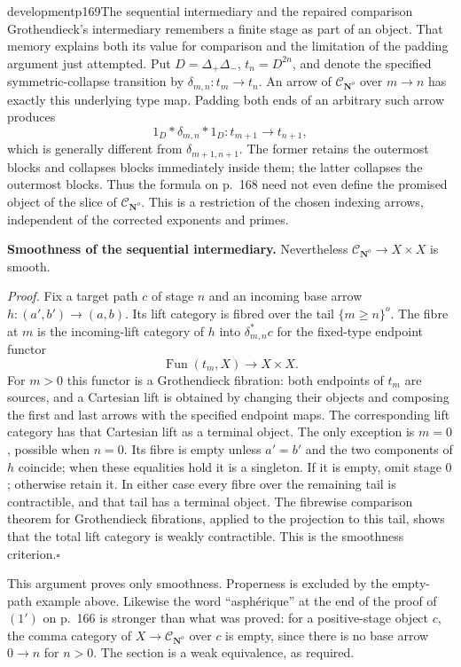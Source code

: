 \begin{dcomment}{development}{p169}{The sequential intermediary and the repaired comparison}
Grothendieck's intermediary remembers a finite stage as part of an object. That memory explains both its value for comparison and the limitation of the padding argument just attempted. Put $D=\Delta_+\Delta_-$, $t_n=D^{2n}$, and denote the specified symmetric-collapse transition by $\delta_{m,n}:t_m\to t_n$. An arrow of $\mathcal C_{\mathbf N^o}$ over $m\to n$ has exactly this underlying type map. Padding both ends of an arbitrary such arrow produces
\[
 1_D*\delta_{m,n}*1_D:t_{m+1}\longrightarrow t_{n+1},
\]
which is generally different from $\delta_{m+1,n+1}$. The former retains the outermost blocks and collapses blocks immediately inside them; the latter collapses the outermost blocks. Thus the formula on p.~168 need not even define the promised object of the slice of $\mathcal C_{\mathbf N^o}$. This is a restriction of the chosen indexing arrows, independent of the corrected exponents and primes.

\textbf{Smoothness of the sequential intermediary.}\ours\quad
Nevertheless $\mathcal C_{\mathbf N^o}\to X\times X$ is smooth.

\emph{Proof.} Fix a target path $c$ of stage $n$ and an incoming base arrow $h:(a',b')\to(a,b)$. Its lift category is fibred over the tail $\{m\geq n\}^o$. The fibre at $m$ is the incoming-lift category of $h$ into $\delta_{m,n}^*c$ for the fixed-type endpoint functor
\[
 \operatorname{Fun}(t_m,X)\longrightarrow X\times X.
\]
For $m>0$ this functor is a Grothendieck fibration: both endpoints of $t_m$ are sources, and a Cartesian lift is obtained by changing their objects and composing the first and last arrows with the specified endpoint maps. The corresponding lift category has that Cartesian lift as a terminal object. The only exception is $m=0$, possible when $n=0$. Its fibre is empty unless $a'=b'$ and the two components of $h$ coincide; when these equalities hold it is a singleton. If it is empty, omit stage $0$; otherwise retain it. In either case every fibre over the remaining tail is contractible, and that tail has a terminal object. The fibrewise comparison theorem for Grothendieck fibrations, applied to the projection to this tail, shows that the total lift category is weakly contractible. This is the smoothness criterion.\hfill$\square$

This argument proves only smoothness. Properness is excluded by the empty-path example above. Likewise the word ``asph\'erique'' at the end of the proof of $(1')$ on p.~166 is stronger than what was proved: for a positive-stage object $c$, the comma category of $X\to\mathcal C_{\mathbf N^o}$ over $c$ is empty, since there is no base arrow $0\to n$ for $n>0$. The section is a weak equivalence, as required.


\end{dcomment}
